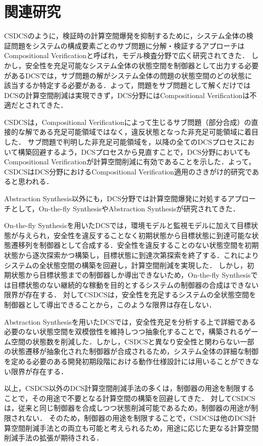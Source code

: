 \section{関連研究}
\label{section:relatedwork}
CSDCSのように，検証時の計算空間爆発を抑制するために，システム全体の検証問題をシステムの構成要素ごとのサブ問題に分解・検証するアプローチはCompositional Verificationと呼ばれ，モデル検査分野で広く研究されてきた\cite{paper:CompositionalVerification_1}\cite{paper:CompositionalVerification_2}\cite{paper:CompositionalVerification_3}\cite{paper:CompositionalVerification_4}\cite{paper:CompositionalVerification_5}\cite{paper:CompositionalVerification_6}\cite{paper:CompositionalVerification_7}\cite{paper:CompositionalVerification_8}．
しかし，安全性を充足可能なシステム全体の状態空間を制御器として出力する必要があるDCSでは，サブ問題の解がシステム全体の問題の状態空間のどの状態に該当するか特定する必要がある．よって，問題をサブ問題として解くだけではDCSの計算空間削減は実現できず，DCS分野にはCompositional Verificationは不適だとされてきた．

CSDCSは，Compositional Verificationによって生じるサブ問題（部分合成）の直接的な解である充足可能領域ではなく，違反状態となった非充足可能領域に着目した．
サブ問題で判明した非充足可能領域を，以降の全てのDCSプロセスにおいて構築回避するよう，DCSプロセスから見直すことで，DCS分野においてもCompositional Verificationが計算空間削減に有効であることを示した．よって，CSDCSはDCS分野におけるCompositional Verification適用のさきがけ的研究であると思われる．

Abstraction Synthesis以外にも，DCS分野では計算空間爆発に対処するアプローチとして，On-the-fly SynthesisやAbstraction Synthesisが研究されてきた．

On-the-fly Synthesisを用いたDCS\cite{paper:On-the-flySyntehsis_1}\cite{paper:On-the-flySyntehsis_2}\cite{paper:On-the-flySyntehsis_3}\cite{paper:On-the-flySyntehsis_4}では，環境モデルと監視モデルに加えて目標状態が与えられ，安全性を違反することなく初期状態から目標状態に到達可能な状態遷移列を制御器として合成する．安全性を違反することのない状態空間を初期状態から逐次探索かつ構築し，目標状態に到達次第探索を終了する．これによりシステムの全状態空間の構築を回避し，計算空間削減を実現した．
しかし，初期状態から目標状態までの制御器しか導出できないため，On-the-fly Synthesisでは目標状態のない継続的な稼動を目的とするシステムの制御器の合成はできない限界が存在する．
対してCSDCSは，安全性を充足するシステムの全状態空間を制御器として導出できることから，このような限界は存在しない．

Abstraction Synthesisを用いたDCS\cite{paper:SynthesisAbstraction_1}\cite{paper:SynthesisAbstraction_2}\cite{aizawa:IEICEJ2020}では，安全性充足を分析する上で詳細である必要のない状態空間を双模倣性を維持しつつ抽象化することで，構築されるゲーム空間の状態数を削減した．しかし，CSDCSと異なり安全性と関わらない一部の状態遷移が抽象化された制御器が合成されるため，システム全体の詳細な制御を定める必要のある開発初期段階における動作仕様設計には用いることができない限界が存在する．

以上，CSDCS以外のDCS計算空間削減手法の多くは，制御器の用途を制限することで，その用途で不要となる計算空間の構築を回避してきた．
対してCSDCSは，従来と同じ制御器を合成しつつ状態削減可能であるため，制御器の用途が制限されない．
そのため，制御器の用途を制限することで，CSDCSは他のDCS計算空間削減手法との両立も可能と考えられるため，用途に応じた更なる計算空間削減手法の拡張が期待される．